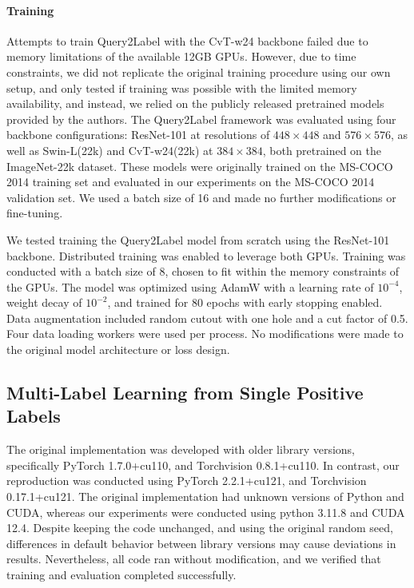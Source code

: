 \documentclass[lettersize,journal]{IEEEtran}
\begin{document}
\paragraph{Training}
Attempts to train Query2Label with the CvT-w24 backbone failed due to memory limitations of the available 12GB GPUs. However, due to time constraints, we did not replicate the original training procedure using our own setup, and only tested if training was possible with the limited memory availability, and instead, we relied on the publicly released pretrained models provided by the authors. The Query2Label framework was evaluated using four backbone configurations: ResNet-101 at resolutions of $448\times448$ and $576\times576$, as well as Swin-L(22k) and CvT-w24(22k) at $384\times384$, both pretrained on the ImageNet-22k \cite{imagenet} dataset. These models were originally trained on the MS-COCO 2014 training set and evaluated in our experiments on the MS-COCO 2014 validation set. We used a batch size of 16 and made no further modifications or fine-tuning.

We tested training the Query2Label model from scratch using the ResNet-101 backbone. Distributed training was enabled to leverage both GPUs. Training was conducted with a batch size of 8, chosen to fit within the memory constraints of the GPUs. The model was optimized using AdamW with a learning rate of $10^{-4}$, weight decay of $10^{-2}$, and trained for 80 epochs with early stopping enabled. Data augmentation included random cutout with one hole and a cut factor of 0.5. Four data loading workers were used per process. No modifications were made to the original model architecture or loss design.


\subsection{Multi-Label Learning from Single Positive Labels}
The original implementation was developed with older library versions, specifically PyTorch 1.7.0+cu110, and Torchvision 0.8.1+cu110. In contrast, our reproduction was conducted using PyTorch 2.2.1+cu121, and Torchvision 0.17.1+cu121. The original implementation had unknown versions of Python and CUDA, whereas our experiments were conducted using python 3.11.8 and CUDA 12.4. Despite keeping the code unchanged, and using the original random seed, differences in default behavior between library versions may cause deviations in results. Nevertheless, all code ran without modification, and we verified that training and evaluation completed successfully.
\end{document}

